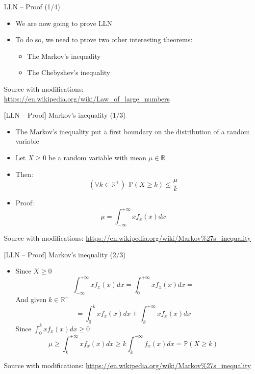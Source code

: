 \documentclass{beamer}
\begin{document}
\begin{frame}
{\centerline{LLN -- Proof (1/4)}}

\begin{itemize}
\item We are now going to prove LLN\\
\item To do so, we need to prove two other interesting theorems:
\begin{itemize}
\item The Markov's inequality\\
\item The Chebyshev's inequality
\end{itemize}

\end{itemize}

\begin{center}
\tiny 
Source with modifications: \url{https://en.wikipedia.org/wiki/Law_of_large_numbers}
\end{center}
\end{frame}


\begin{frame}
{\centerline{[LLN -- Proof] Markov's inequality (1/3)}}

\begin{itemize}
\item The Markov's inequality put a first boundary on the distribution of a random variable
\item Let $X \geq 0$ be a random variable with mean $\mu \in \mathbb{R}$
\item Then:
$$ (\forall k \in \mathbb{R}^+) ~~  \mathbb{P} ( X  \geq k) \leq \frac{\mu}{k} $$
\item Proof:
$$ \mu = \int_{- \infty }^{+ \infty} xf_x(x)dx$$
\end{itemize}
 
\begin{center}
\tiny 
Source with modifications: \url{https://en.wikipedia.org/wiki/Markov\%27s_inequality}
\end{center}

\end{frame}

\begin{frame}
{\centerline{[LLN -- Proof] Markov's inequality (2/3)}}

\begin{itemize}
\item Since $X \geq 0 $
$$\int_{- \infty }^{+ \infty} xf_x(x)dx = \int_{0}^{+ \infty} xf_x(x)dx = $$
And given $k \in \mathbb{R}^+$
$$= \int_{0}^{k} xf_x(x)dx + \int_{k}^{+ \infty} xf_x(x)dx$$
Since $\int_{0}^{k} xf_x(x)dx \geq 0$ 
$$ \mu \geq \int_{k}^{+ \infty} xf_x(x)dx \geq k\int_{k}^{+ \infty} f_x(x)dx =  \mathbb{P} ( X  \geq k) $$
\end{itemize}
 
\begin{center}
\tiny 
Source with modifications: \url{https://en.wikipedia.org/wiki/Markov\%27s_inequality}
\end{center}

\end{frame}
\end{document}
